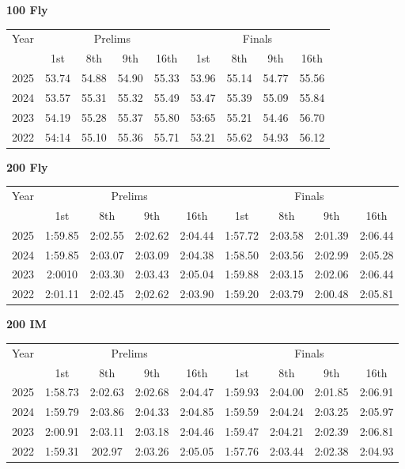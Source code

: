 \textbf{100 Fly}

\begin{flushleft}
\begin{tabular}{|c|c|c|c|c|c|c|c|c|}
\hline
Year & \multicolumn{4}{c|}{Prelims} & \multicolumn{4}{c|}{Finals} \\
\cline{2-9}
& 1st & 8th & 9th & 16th & 1st & 8th & 9th & 16th \\
\hline
2025 & 53.74 & 54.88 & 54.90 & 55.33 & 53.96 & 55.14 & 54.77 & 55.56 \\
2024 & 53.57 & 55.31 & 55.32 & 55.49 & 53.47 & 55.39 & 55.09 & 55.84 \\
2023 & 54.19 & 55.28 & 55.37 & 55.80 & 53:65 & 55.21 & 54.46 & 56.70 \\
2022 & 54:14 & 55.10 & 55.36 & 55.71 & 53.21 & 55.62 & 54.93 & 56.12 \\
\hline
\end{tabular}
\end{flushleft}

\textbf{200 Fly}

\begin{flushleft}
\begin{tabular}{|c|c|c|c|c|c|c|c|c|}
\hline
Year & \multicolumn{4}{c|}{Prelims} & \multicolumn{4}{c|}{Finals} \\
\cline{2-9}
& 1st & 8th & 9th & 16th & 1st & 8th & 9th & 16th \\
\hline
2025 & 1:59.85 & 2:02.55 & 2:02.62 & 2:04.44 & 1:57.72 & 2:03.58 & 2:01.39 & 2:06.44 \\
2024 & 1:59.85 & 2:03.07 & 2:03.09 & 2:04.38 & 1:58.50 & 2:03.56 & 2:02.99 & 2:05.28 \\
2023 & 2:0010 & 2:03.30 & 2:03.43 & 2:05.04 & 1:59.88 & 2:03.15 & 2:02.06 & 2:06.44 \\
2022 & 2:01.11 & 2:02.45 & 2;02.62 & 2:03.90 & 1:59.20 & 2:03.79 & 2:00.48 & 2:05.81 \\
\hline
\end{tabular}
\end{flushleft}

\clearpage
\textbf{200 IM}

\begin{flushleft}
\begin{tabular}{|c|c|c|c|c|c|c|c|c|}
\hline
Year & \multicolumn{4}{c|}{Prelims} & \multicolumn{4}{c|}{Finals} \\
\cline{2-9}
& 1st & 8th & 9th & 16th & 1st & 8th & 9th & 16th \\
\hline
2025 & 1:58.73 & 2:02.63 & 2:02.68 & 2:04.47 & 1:59.93 & 2:04.00 & 2:01.85 & 2:06.91 \\
2024 & 1:59.79 & 2:03.86 & 2:04.33 & 2:04.85 & 1:59.59 & 2:04.24 & 2:03.25 & 2:05.97 \\
2023 & 2:00.91 & 2:03.11 & 2:03.18 & 2:04.46 & 1:59.47 & 2:04.21 & 2:02.39 & 2:06.81 \\
2022 & 1:59.31 & 202.97 & 2:03.26 & 2:05.05 & 1:57.76 & 2:03.44 & 2:02.38 & 2:04.93 \\
\hline
\end{tabular}
\end{flushleft}

